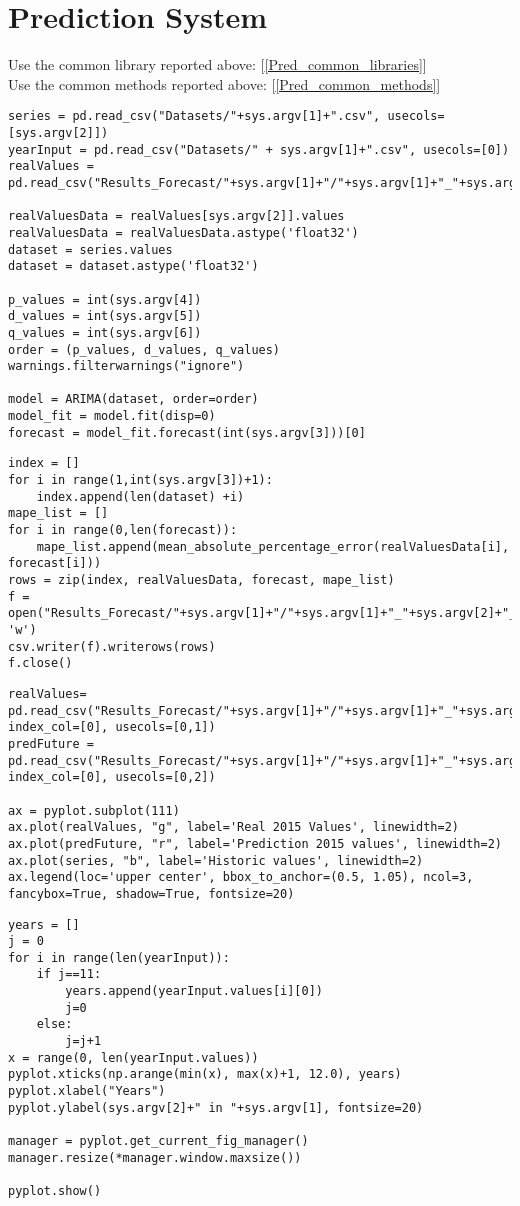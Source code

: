\section{Prediction System}
\label{Prediction_System}
Use the common library reported above: [\ref{Pred_common_libraries}] \\
Use the common methods reported above: [\ref{Pred_common_methods}] \\
\begin{lstlisting}
series = pd.read_csv("Datasets/"+sys.argv[1]+".csv", usecols=[sys.argv[2]])
yearInput = pd.read_csv("Datasets/" + sys.argv[1]+".csv", usecols=[0])
realValues = pd.read_csv("Results_Forecast/"+sys.argv[1]+"/"+sys.argv[1]+"_"+sys.argv[2]+"_2015.csv")

realValuesData = realValues[sys.argv[2]].values
realValuesData = realValuesData.astype('float32')
dataset = series.values
dataset = dataset.astype('float32')

p_values = int(sys.argv[4])
d_values = int(sys.argv[5])
q_values = int(sys.argv[6])
order = (p_values, d_values, q_values)
warnings.filterwarnings("ignore")

model = ARIMA(dataset, order=order)
model_fit = model.fit(disp=0)
forecast = model_fit.forecast(int(sys.argv[3]))[0]
\end{lstlisting}
\begin{lstlisting}
index = []
for i in range(1,int(sys.argv[3])+1):
	index.append(len(dataset) +i)
mape_list = []
for i in range(0,len(forecast)):
	mape_list.append(mean_absolute_percentage_error(realValuesData[i], forecast[i]))
rows = zip(index, realValuesData, forecast, mape_list)
f = open("Results_Forecast/"+sys.argv[1]+"/"+sys.argv[1]+"_"+sys.argv[2]+"_futurePred.csv", 'w')
csv.writer(f).writerows(rows)
f.close()
\end{lstlisting}
\begin{lstlisting}
realValues= pd.read_csv("Results_Forecast/"+sys.argv[1]+"/"+sys.argv[1]+"_"+sys.argv[2]+"_futurePred.csv", index_col=[0], usecols=[0,1])
predFuture = pd.read_csv("Results_Forecast/"+sys.argv[1]+"/"+sys.argv[1]+"_"+sys.argv[2]+"_futurePred.csv", index_col=[0], usecols=[0,2])

ax = pyplot.subplot(111)
ax.plot(realValues, "g", label='Real 2015 Values', linewidth=2)
ax.plot(predFuture, "r", label='Prediction 2015 values', linewidth=2)
ax.plot(series, "b", label='Historic values', linewidth=2)
ax.legend(loc='upper center', bbox_to_anchor=(0.5, 1.05), ncol=3, fancybox=True, shadow=True, fontsize=20)
\end{lstlisting}
\begin{lstlisting}
years = []
j = 0
for i in range(len(yearInput)):
    if j==11:
        years.append(yearInput.values[i][0])
        j=0
    else:
        j=j+1 
x = range(0, len(yearInput.values))
pyplot.xticks(np.arange(min(x), max(x)+1, 12.0), years)
pyplot.xlabel("Years")
pyplot.ylabel(sys.argv[2]+" in "+sys.argv[1], fontsize=20)

manager = pyplot.get_current_fig_manager()
manager.resize(*manager.window.maxsize())

pyplot.show()

\end{lstlisting}
